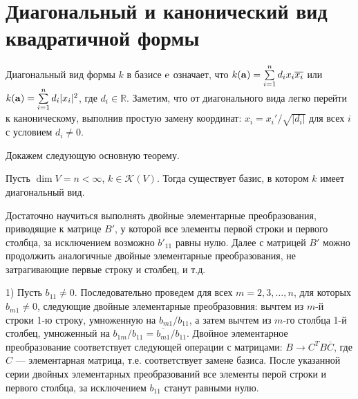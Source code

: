 \section{Диагональный и канонический вид квадратичной формы}





Диагональный вид формы $k$ в базисе $\mathrm{e}$ означает, что $k(\mathbf{a}) = \sum\limits_{i=1}^n d_i x_i\overline{x_i}$ или 
$k(\mathbf{a}) = \sum\limits_{i=1}^n d_i |x_i|^2$, где $d_i\in \mathbb{R}$.
Заметим, что от диагонального вида легко перейти к каноническому, выполнив простую замену координат: $x_i = x_i'/\sqrt{|d_i|}$ для всех $i$ с условием $d_i\neq 0$.

Докажем следующую основную теорему.


\begin{theor}\label{t9_3_1}
Пусть $\dim V=n<\infty$,  $k \in \mathcal{K} (V)$. Тогда существует базис, в котором $k$ имеет диагональный вид. 
\end{theor}
\dok 
Достаточно научиться выполнять двойные элементарные преобразования, приводящие к матрице $B'$, у которой 
все элементы первой строки и первого столбца, за исключением возможно $b'_{11}$ равны нулю. 
Далее с матрицей $B'$ можно продолжить аналогичные двойные элементарные преобразования,
не затрагивающие первые строку и столбец, и т.д.

1) Пусть $b_{11}\neq 0$. Последовательно проведем для всех $m=2, 3, \ldots, n$, для которых $b_{m1}\neq 0$,  следующие двойные элементарные преобразовния:
вычтем из $m$-й строки 1-ю строку, умноженную на $b_{m1}/b_{11}$, а затем вычтем из $m$-го столбца 1-й столбец, умноженный на $b_{1m}/b_{11} = \overline{b_{m1}}/b_{11}$.
Двойное элементарное преобразование соответствует следующей операции с матрицами: $B\to C^TB\overline{C} $, где $C$ --- элементарная матрица, т.е. соответствует замене базиса.
После указанной серии двойных элементарных преобразований все элементы перой строки и первого столбца, за исключением $b_{11}$ станут равными нулю.

